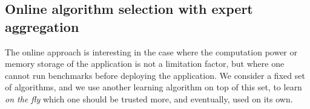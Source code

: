 



\subsection{Online algorithm selection with expert aggregation}

The online approach is interesting in the case where the computation power or memory storage of the application is not a limitation factor, but where one cannot run benchmarks before deploying the application.
We consider a fixed set of algorithms, and we use another learning algorithm on top of this set, to learn \emph{on the fly} which one should be trusted more, and eventually, used on its own.







